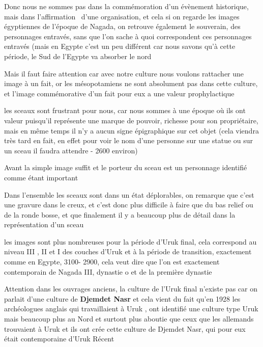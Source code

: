 \documentclass[a4paper]{article}
\begin{document}
{
\newline
Donc nous ne sommes pas dans la commémoration d'un évènement historique,
mais dans l'affirmation \ d'une organisation, et cela si on regarde les
images égyptiennes de l'époque de Nagada, on retrouve également le
souverain, des personnages entravés, sans que l'on sache à quoi
correspondent ces personnages entravés (mais en Egypte c'est un peu
différent car nous savons qu'à cette période, le Sud de l'Egypte va
absorber le nord}


\bigskip

{
Mais il faut faire attention car avec notre culture nous voulons
rattacher une image à un fait, or les mésopotamiens ne sont absolument
pas dans cette culture, et l'image commémorative d'un fait pour eux a
une valeur prophylactique}


\bigskip

{
les sceaux sont frustrant pour nous, car nous sommes à une époque où ils
ont valeur puisqu'il représente une marque de pouvoir, richesse pour
son propriétaire, mais en même temps il n'y a aucun signe épigraphique
sur cet objet (cela viendra très tard en fait, en effet pour voir le
nom d'une personne sur une statue ou sur un sceau il faudra attendre -
2600 environ)}


\bigskip

{
Avant la simple image suffit et le porteur du sceau est un personnage
identifié comme étant important}


\bigskip

{
Dans l'ensemble les sceaux sont dans un état déplorables, on remarque
que c'est une gravure dans le creux, et c'est donc plus difficile à
faire que du bas relief ou de la ronde bosse, et que finalement il y a
beaucoup plus de détail dans la représentation d'un sceau}


\bigskip

{
les images sont plus nombreuses pour la période d'Uruk final, cela
correspond au niveau III , II et I des couches d'Uruk et à la période
de transition, exactement comme en Egypte, 3100- 2900, cela veut dire
que l'on est exactement contemporain de Nagada III, dynastie o et de la
première dynastie}


\bigskip

{
Attention dans les ouvrages anciens, la culture de l'Uruk final n'existe
pas car on parlait d'une culture de \textbf{Djemdet Nasr} et cela vient
du fait qu'en 1928 les archéologues anglais qui travaillaient à Uruk ,
ont identifié une culture type Uruk mais beaucoup plus au Nord et
surtout plus aboutie que ceux que les allemands trouvaient à Uruk et
ils ont crée cette culture de Djemdet Nasr, qui pour eux était
contemporaine d'Uruk Récent}
\end{document}
